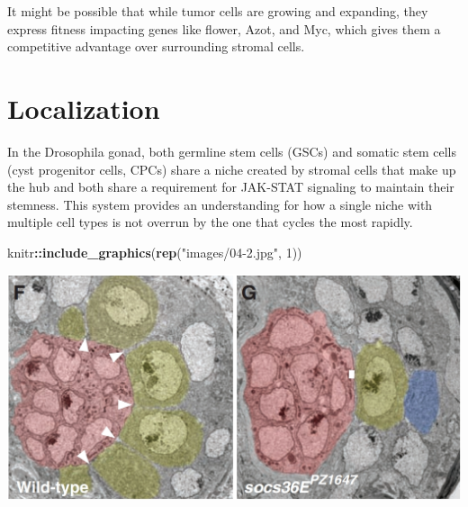 \documentclass[]{book}
\newenvironment{Shaded}{\begin{snugshade}}{\end{snugshade}}
\newcommand{\DataTypeTok}[1]{\textcolor[rgb]{0.13,0.29,0.53}{#1}}
\newcommand{\DecValTok}[1]{\textcolor[rgb]{0.00,0.00,0.81}{#1}}
\newcommand{\KeywordTok}[1]{\textcolor[rgb]{0.13,0.29,0.53}{\textbf{#1}}}
\newcommand{\NormalTok}[1]{#1}
\newcommand{\OperatorTok}[1]{\textcolor[rgb]{0.81,0.36,0.00}{\textbf{#1}}}
\newcommand{\OtherTok}[1]{\textcolor[rgb]{0.56,0.35,0.01}{#1}}
\newcommand{\StringTok}[1]{\textcolor[rgb]{0.31,0.60,0.02}{#1}}
\begin{document}
It might be possible that while tumor cells are growing and expanding, they express fitness impacting genes like flower, Azot, and Myc, which gives them a competitive advantage over surrounding stromal cells.

\hypertarget{localization}{%
\section{Localization}\label{localization}}

In the Drosophila gonad, both germline stem cells (GSCs) and somatic stem cells (cyst progenitor cells, CPCs) share a niche created by stromal cells that make up the hub and both share a requirement for JAK-STAT signaling to maintain their stemness. This system provides an understanding for how a single niche with multiple cell types is not overrun by the one that cycles the most rapidly.

\begin{Shaded}
\begin{Highlighting}[]
\NormalTok{knitr}\OperatorTok{::}\KeywordTok{include_graphics}\NormalTok{(}\KeywordTok{rep}\NormalTok{(}\StringTok{"images/04-2.jpg"}\NormalTok{, }\DecValTok{1}\NormalTok{))}
\end{Highlighting}
\end{Shaded}

\includegraphics{images/04-2.jpg}

\begin{Shaded}
\end{Shaded}
\end{document}
